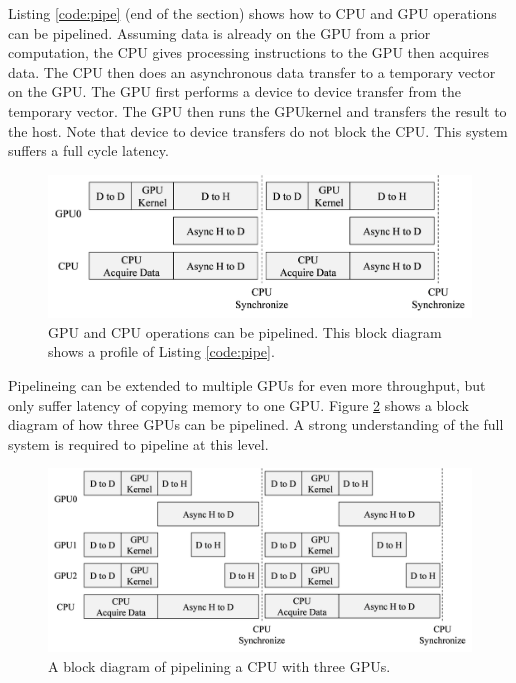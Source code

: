 Listing \ref{code:pipe} (end of the section) shows how to CPU and GPU operations can be pipelined.
Assuming data is already on the GPU from a prior computation, the CPU gives processing instructions to the GPU then acquires data.
The CPU then does an asynchronous data transfer to a temporary vector on the GPU.
The GPU first performs a device to device transfer from the temporary vector.
The GPU then runs the GPUkernel and transfers the result to the host.
Note that device to device transfers do not block the CPU.
This system suffers a full cycle latency.
\begin{figure}
	\centering\includegraphics[width=9.97in/100*55]{figures/gpu_intro/concurrentCPU_nonBlocking.pdf}
	\caption{GPU and CPU operations can be pipelined. This block diagram shows a profile of Listing \ref{code:pipe}.}
	\label{fig:concurrentCPU_nonBlocking}
\end{figure}

Pipelineing can be extended to multiple GPUs for even more throughput, but only suffer latency of copying memory to one GPU.
Figure \ref{fig:concurrentCPU_nonBlocking_multiGPU} shows a block diagram of how three GPUs can be pipelined.
A strong understanding of the full system is required to pipeline at this level.
\begin{figure}
	\centering\includegraphics[width=11.4in/100*55]{figures/gpu_intro/concurrentCPU_nonBlocking_multiGPU.pdf}
	\caption{A block diagram of pipelining a CPU with three GPUs.}
	\label{fig:concurrentCPU_nonBlocking_multiGPU}
\end{figure}

